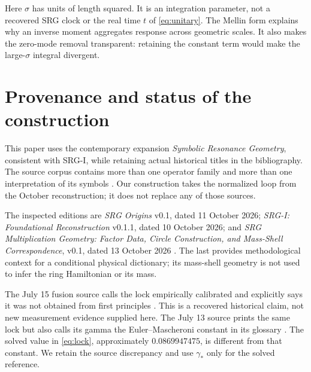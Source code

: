 \documentclass[11pt,a4paper]{article}
\theoremstyle{definition}\newtheorem{definition}[theorem]{Definition}
\theoremstyle{remark}\newtheorem{remark}[theorem]{Remark}
\numberwithin{equation}{section}
\begin{document}
Here \(\sigma\) has units of length squared. It is an integration
parameter, not a recovered SRG clock or the real time \(t\) of
\eqref{eq:unitary}. The Mellin form explains why an inverse moment
aggregates response across geometric scales. It also makes the
zero-mode removal transparent: retaining the constant term would make
the large-\(\sigma\) integral divergent.

\section{Provenance and status of the construction}\label{sec:provenance}
This paper uses the contemporary expansion \emph{Symbolic Resonance
Geometry}, consistent with SRG-I, while retaining actual historical
titles in the bibliography. The source corpus contains more than one
operator family and more than one interpretation of its symbols
\cite{srgi}. Our construction takes the normalized loop from the
October reconstruction; it does not replace any of those sources.

The inspected editions are \emph{SRG Origins} v0.1, dated 11 October
2026; \emph{SRG-I: Foundational Reconstruction} v0.1.1, dated
10 October 2026; and \emph{SRG Multiplication Geometry: Factor Data,
Circle Construction, and Mass-Shell Correspondence}, v0.1, dated 13 October 2026
\cite{origins,srgi,massshell}.
The last provides methodological context for a conditional physical
dictionary; its mass-shell geometry is not used to infer the ring
Hamiltonian or its mass.

The July 15 fusion source calls the lock empirically calibrated and
explicitly says it was not obtained from first principles
\cite[physical pp.~3--4]{p01}. This is a recovered historical claim,
not new measurement evidence supplied here.
The July 13 source prints the same lock but also calls its gamma the
Euler--Mascheroni constant in its glossary
\cite[physical pp.~4,6]{p06}. The solved value in \eqref{eq:lock},
approximately \(0.0869947475\), is different from that constant.
We retain the source discrepancy and use \(\gamma_*\) only for the
solved reference.
\end{document}
